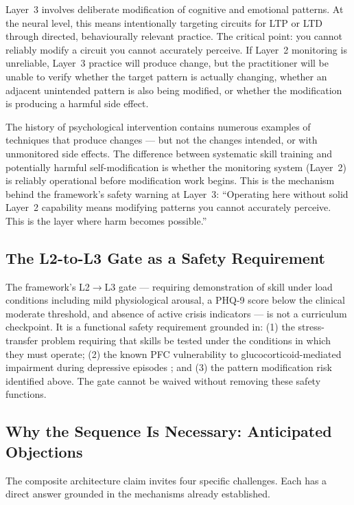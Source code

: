 \documentclass[12pt, a4paper]{article}
\begin{document}
Layer~3 involves deliberate modification of cognitive and emotional patterns.
At the neural level, this means intentionally targeting circuits for LTP or LTD
through directed, behaviourally relevant practice. The critical point: you cannot
reliably modify a circuit you cannot accurately perceive. If Layer~2 monitoring
is unreliable, Layer~3 practice will produce change, but the practitioner will
be unable to verify whether the target pattern is actually changing, whether an
adjacent unintended pattern is also being modified, or whether the modification
is producing a harmful side effect.

The history of psychological intervention contains numerous examples of techniques
that produce changes --- but not the changes intended, or with unmonitored side
effects. The difference between systematic skill training and potentially harmful
self-modification is whether the monitoring system (Layer~2) is reliably operational
before modification work begins. This is the mechanism behind the framework's safety
warning at Layer~3: ``Operating here without solid Layer~2 capability means modifying
patterns you cannot accurately perceive. This is the layer where harm becomes
possible.''

\subsection{The L2-to-L3 Gate as a Safety Requirement}

The framework's L2$\to$L3 gate --- requiring demonstration of skill under load
conditions including mild physiological arousal, a PHQ-9 score below the clinical
moderate threshold, and absence of active crisis indicators --- is not a curriculum
checkpoint. It is a functional safety requirement grounded in: (1) the stress-transfer
problem \citep{raio2013} requiring that skills be tested under the conditions in which
they must operate; (2) the known PFC vulnerability to glucocorticoid-mediated
impairment during depressive episodes \citep{gkintoni2025}; and (3) the pattern
modification risk identified above. The gate cannot be waived without removing
these safety functions.

\subsection{Why the Sequence Is Necessary: Anticipated Objections}

The composite architecture claim invites four specific challenges. Each has a
direct answer grounded in the mechanisms already established.
\end{document}
